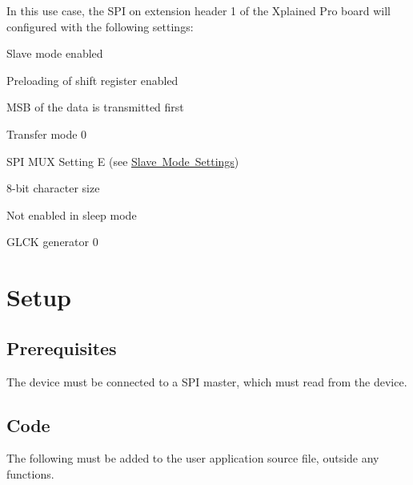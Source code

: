 In this use case, the S\+PI on extension header 1 of the Xplained Pro board will configured with the following settings\+:
\begin{DoxyItemize}
\item Slave mode enabled
\item Preloading of shift register enabled
\item M\+SB of the data is transmitted first
\item Transfer mode 0
\item S\+PI M\+UX Setting E (see \mbox{\hyperlink{asfdoc_sam0_sercom_spi_mux_settings_asfdoc_sam0_sercom_spi_mux_settings_slave}{Slave Mode Settings}})
\item 8-\/bit character size
\item Not enabled in sleep mode
\item G\+L\+CK generator 0
\end{DoxyItemize}\hypertarget{asfdoc_sam0_sercom_spi_slave_callback_use_asfdoc_sam0_sercom_spi_slave_callback_use_setup}{}\section{Setup}\label{asfdoc_sam0_sercom_spi_slave_callback_use_asfdoc_sam0_sercom_spi_slave_callback_use_setup}
\hypertarget{asfdoc_sam0_sercom_spi_slave_callback_use_asfdoc_sam0_sercom_spi_slave_callback_useprereq}{}\subsection{Prerequisites}\label{asfdoc_sam0_sercom_spi_slave_callback_use_asfdoc_sam0_sercom_spi_slave_callback_useprereq}
The device must be connected to a S\+PI master, which must read from the device.\hypertarget{asfdoc_sam0_sercom_spi_slave_callback_use_asfdoc_sam0_sercom_spi_slave_callback_use_setup_code}{}\subsection{Code}\label{asfdoc_sam0_sercom_spi_slave_callback_use_asfdoc_sam0_sercom_spi_slave_callback_use_setup_code}
The following must be added to the user application source file, outside any functions.

